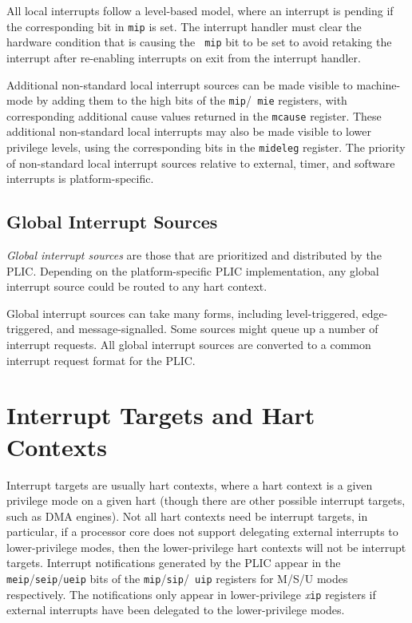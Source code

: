 All local interrupts follow a level-based model, where an interrupt is
pending if the corresponding bit in {\tt mip} is set.  The interrupt
handler must clear the hardware condition that is causing the {\tt
  mip} bit to be set to avoid retaking the interrupt after re-enabling
interrupts on exit from the interrupt handler.

Additional non-standard local interrupt sources can be made visible to
machine-mode by adding them to the high bits of the {\tt mip}/{\tt
  mie} registers, with corresponding additional cause values returned
in the {\tt mcause} register.  These additional non-standard local
interrupts may also be made visible to lower privilege levels, using
the corresponding bits in the {\tt mideleg} register.  The priority of
non-standard local interrupt sources relative to external, timer, and
software interrupts is platform-specific.

\subsection{Global Interrupt Sources}

{\em Global interrupt sources} are those that are prioritized and
distributed by the PLIC.  Depending on the platform-specific PLIC
implementation, any global interrupt source could be routed to any
hart context.

Global interrupt sources can take many forms, including
level-triggered, edge-triggered, and message-signalled.  Some sources
might queue up a number of interrupt requests.  All global interrupt
sources are converted to a common interrupt request format for the
PLIC.

\section{Interrupt Targets and Hart Contexts}

Interrupt targets are usually hart contexts, where a hart context is a
given privilege mode on a given hart (though there are other possible
interrupt targets, such as DMA engines).  Not all hart contexts need
be interrupt targets, in particular, if a processor core does not
support delegating external interrupts to lower-privilege modes, then
the lower-privilege hart contexts will not be interrupt targets.
Interrupt notifications generated by the PLIC appear in the {\tt
  meip}/{\tt seip}/{\tt ueip} bits of the {\tt mip}/{\tt sip}/{\tt
  uip} registers for M/S/U modes respectively.  The notifications
only appear in lower-privilege {\em x}{\tt ip} registers if external
interrupts have been delegated to the lower-privilege modes.

